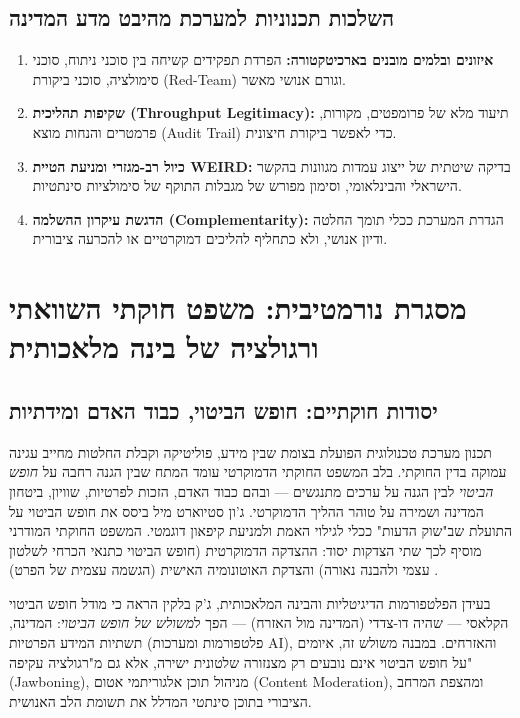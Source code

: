 \subsection{השלכות תכנוניות למערכת מהיבט מדע המדינה}
\begin{enumerate}
    \item \textbf{איזונים ובלמים מובנים בארכיטקטורה:} הפרדת תפקידים קשיחה בין סוכני ניתוח, סוכני סימולציה, סוכני ביקורת (Red-Team) וגורם אנושי מאשר.
    \item \textbf{שקיפות תהליכית (Throughput Legitimacy):} תיעוד מלא של פרומפטים, מקורות, פרמטרים והנחות מוצא (Audit Trail) כדי לאפשר ביקורת חיצונית.
    \item \textbf{כיול רב-מגזרי ומניעת הטיית WEIRD:} בדיקה שיטתית של ייצוג עמדות מגוונות בהקשר הישראלי והבינלאומי, וסימון מפורש של מגבלות התוקף של סימולציות סינתטיות.
    \item \textbf{הדגשת עיקרון ההשלמה (Complementarity):} הגדרת המערכת ככלי תומך החלטה ודיון אנושי, ולא כתחליף להליכים דמוקרטיים או להכרעה ציבורית.
\end{enumerate}

\section{מסגרת נורמטיבית: משפט חוקתי השוואתי ורגולציה של בינה מלאכותית}
\label{sec:constitutional-law}

\subsection{יסודות חוקתיים: חופש הביטוי, כבוד האדם ומידתיות}
תכנון מערכת טכנולוגית הפועלת בצומת שבין מידע, פוליטיקה וקבלת החלטות מחייב עגינה עמוקה בדין החוקתי. בלב המשפט החוקתי הדמוקרטי עומד המתח שבין הגנה רחבה על \emph{חופש הביטוי} לבין הגנה על ערכים מתנגשים --- ובהם כבוד האדם, הזכות לפרטיות, שוויון, ביטחון המדינה ושמירה על טוהר ההליך הדמוקרטי. ג'ון סטיוארט מיל \cite{mill1859liberty} ביסס את חופש הביטוי על התועלת שב"שוק הדעות" ככלי לגילוי האמת ולמניעת קיפאון דוגמטי. המשפט החוקתי המודרני מוסיף לכך שתי הצדקות יסוד: ההצדקה הדמוקרטית (חופש הביטוי כתנאי הכרחי לשלטון עצמי ולהבנה נאורה) והצדקת האוטונומיה האישית (הגשמה עצמית של הפרט) \cite{barak2006judge}.

בעידן הפלטפורמות הדיגיטליות והבינה המלאכותית, ג'ק בלקין \cite{balkin2018free} הראה כי מודל חופש הביטוי הקלאסי --- שהיה דו-צדדי (המדינה מול האזרח) --- הפך ל\emph{משולש של חופש הביטוי}: המדינה, תשתיות המידע הפרטיות (פלטפורמות ומערכות AI), והאזרחים. במבנה משולש זה, איומים על חופש הביטוי אינם נובעים רק מצנזורה שלטונית ישירה, אלא גם מ"רגולציה עקיפה" (Jawboning), מניהול תוכן אלגוריתמי אטום (Content Moderation), ומהצפת המרחב הציבורי בתוכן סינתטי המדלל את תשומת הלב האנושית.

